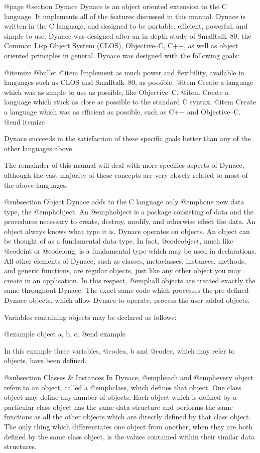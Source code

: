 @page
@section Dynace
Dynace is an object oriented extension to the C language.  It implements
all of the features discussed in this manual.  Dynace is written in the
C language, and designed to be portable, efficient, powerful, and
simple to use.  Dynace was designed after an in depth study of Smalltalk--80,
the Common Lisp Object System (CLOS), Objective--C, C++, as well as
object oriented principles in general.  Dynace was designed with the following
goals:

@itemize @bullet
@item  Implement as much power and flexibility, available in languages such
as CLOS and Smalltalk--80, as possible.
@item  Create a language which was as simple to use as possible, like
Objective--C.
@item  Create a language which stuck as close as possible to the standard
C syntax.
@item  Create a language which was as efficient as possible, such as C++
and Objective--C.
@end itemize

Dynace succeeds in the satisfaction of these specific goals better than any
of the other languages above.

The remainder of this manual will deal with more specifics aspects of Dynace,
although the vast majority of these concepts are very closely related to
most of the above languages.

@subsection Object
Dynace adds to the C language only @emph{one} new data type, the @emph{object}.
An @emph{object} is a package consisting of data and the procedures
necessary to create, destroy, modify, and otherwise effect the data.  An
object always knows what type it is.  Dynace operates on objects.  An
object can be thought of as a fundamental data type.  In fact,
@code{object}, much like @code{int} or @code{long}, is a fundamental
type which may be used in declarations.  All other elements of Dynace, such
as classes, metaclasses, instances, methods, and generic functions, are
regular objects, just like any other object you may create in an
application.  In this respect, @emph{all} objects are treated exactly
the same throughout Dynace.  The exact same code which processes the pre-defined
Dynace objects, which allow Dynace to operate, process the user added objects.

Variables containing objects may be declared as follows:

@example
        object    a, b, c;
@end example

In this example three variables, @code{a, b} and @code{c}, which may
refer to objects, have been defined.

@subsection Classes & Instances
In Dynace, @emph{each} and @emph{every} object refers to an object, called
a @emph{class}, which defines that object.  One class object may define
any number of objects.  Each object which is defined by a particular
class object has the same data structure and performs the same functions
as all the other objects which are directly defined by that class
object.  The only thing which differentiates one object from another,
when they are both defined by the same class object, is the values
contained within their similar data structures.

